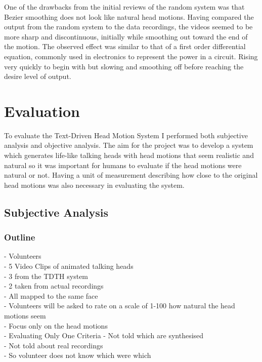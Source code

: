\documentclass[bsc,frontabs,twoside,singlespacing,parskip]{infthesis}
\begin{document}
One of the drawbacks from the initial reviews of the random system was that Bezier smoothing does not look like natural head motions. Having compared the output from the random system to the data recordings, the videos seemed to be more sharp and discontinuous, initially while smoothing out toward the end of the motion. The observed effect was similar to that of a first order differential equation, commonly used in electronics to represent the power in a circuit. Rising very quickly to begin with but slowing and smoothing off before reaching the desire level of output. 


\chapter{Evaluation}

To evaluate the Text-Driven Head Motion System I performed both subjective analysis and objective analysis. The aim for the project was to develop a system which generates life-like talking heads with head motions that seem realistic and natural so it was important for humans to evaluate if the head motions were natural or not. Having a unit of measurement describing how close to the original head motions was also necessary in evaluating the system.

\section{Subjective Analysis}

\subsection{Outline}
- Volunteers\\
- 5 Video Clips of animated talking heads \\
- 3 from the TDTH system\\
- 2 taken from actual recordings \\
- All mapped to the same face \\
- Volunteers will be asked to rate on a scale of 1-100 how natural the head motions seem \\
- Focus only on the head motions \\
- Evaluating Only One Criteria
- Not told which are synthesised\\
- Not told about real recordings \\
- So volunteer does not know which were which\\
\end{document}
